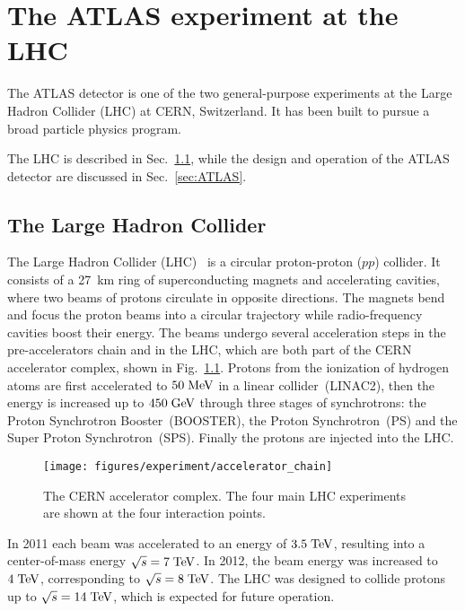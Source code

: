 \chapter{The ATLAS experiment at the LHC}
\label{sec:experiment}

The ATLAS detector is one of the two general-purpose experiments 
at the Large Hadron Collider (LHC) at CERN, Switzerland.
It has been built to pursue a broad particle physics program. 

The LHC is described in Sec.~\ref{sec:LHC}, while the design and operation of the 
ATLAS detector are discussed in Sec.~\ref{sec:ATLAS}.

\section{The Large Hadron Collider}
\label{sec:LHC}

The Large Hadron Collider (LHC)~\cite{LHCreport12, *LHCreport3} 
is a circular proton-proton ($pp$) collider.
It consists of a 27~km ring of superconducting magnets and
accelerating cavities, where two beams of protons circulate in
opposite directions.
The magnets bend and focus the proton beams into a circular trajectory while radio-frequency
cavities boost their energy.
The beams undergo several acceleration steps in the pre-accelerators chain
and in the LHC, which are both part of the CERN accelerator complex, shown in Fig.~\ref{fig:lhc}.
Protons from the ionization of hydrogen atoms are first accelerated to \mbox{$50 \; \mathrm{MeV}$}
in a linear collider~(LINAC2), then the energy is increased up to
\mbox{$450 \; \mathrm{GeV}$} through three stages of synchrotrons: the Proton
Synchrotron Booster~(BOOSTER), the Proton Synchrotron~(PS) and the Super Proton Synchrotron~(SPS).
Finally the protons are injected into the LHC.

\begin{figure}[h]
\begin{center}
\texttt{[image: figures/experiment/accelerator\_chain]}
\caption[CERN Accelerator complex]{
  The CERN accelerator complex. The four main LHC experiments are
  shown at the four interaction points.}
\label{fig:lhc}
\end{center}
\end{figure}
 
In 2011 each beam was accelerated to an energy of \mbox{$3.5 \; \mathrm{TeV}$}, 
resulting into a center-of-mass energy \mbox{$\sqrt{s} = 7 \; \mathrm{TeV}$}.
In 2012, the beam energy was increased to \mbox{$4 \; \mathrm{TeV}$}, 
corresponding to \mbox{$\sqrt{s} = 8 \; \mathrm{TeV}$}.
The LHC was designed to collide protons up to \mbox{$\sqrt{s} = 14 \; \mathrm{TeV}$},
which is expected for future operation.

